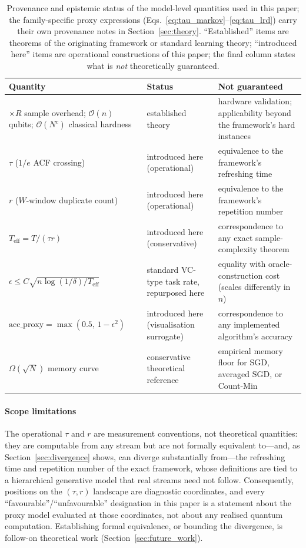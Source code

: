 \documentclass[sensors,article,submit,pdftex,moreauthors]{Definitions/mdpi}
\newcommand{\bigO}{\mathcal{O}}
\newcommand{\Teff}{T_{\mathrm{eff}}}
\begin{document}
\begin{table}[t]
\centering
\caption{Provenance and epistemic status of the model-level quantities used in this paper; the family-specific proxy expressions (Eqs.~\eqref{eq:tau_markov}--\eqref{eq:tau_lrd}) carry their own provenance notes in Section~\ref{sec:theory}. ``Established'' items are theorems of the originating framework or standard learning theory; ``introduced here'' items are operational constructions of this paper; the final column states what is \emph{not} theoretically guaranteed.}
\label{tab:provenance}
\begin{tabularx}{\textwidth}{@{}p{5.1cm}p{3.6cm}X@{}}
\toprule
Quantity & Status & Not guaranteed \\
\midrule
$\times R$ sample overhead; $\bigO(n)$ qubits; $\bigO(N^{c})$ classical hardness & established theory & hardware validation; applicability beyond the framework's hard instances \\
$\tau$ ($1/e$ ACF crossing) & introduced here (operational) & equivalence to the framework's refreshing time \\
$r$ ($W$-window duplicate count) & introduced here (operational) & equivalence to the framework's repetition number \\
$\Teff = T/(\tau r)$ & introduced here (conservative) & correspondence to any exact sample-complexity theorem \\
$\epsilon \leq C\sqrt{n \log(1/\delta)/\Teff}$ & standard VC-type task rate, repurposed here & equality with oracle-construction cost (scales differently in $n$) \\
$\mathrm{acc\_proxy} = \max(0.5,\, 1 - \epsilon^2)$ & introduced here (visualisation surrogate) & correspondence to any implemented algorithm's accuracy \\
$\Omega(\sqrt{N})$ memory curve & conservative theoretical reference & empirical memory floor for SGD, averaged SGD, or Count-Min \\
\bottomrule
\end{tabularx}
\end{table}

\paragraph{Scope limitations} The operational $\tau$ and $r$ are measurement conventions, not theoretical quantities: they are computable from any stream but are not formally equivalent to---and, as Section~\ref{sec:divergence} shows, can diverge substantially from---the refreshing time and repetition number of the exact framework, whose definitions are tied to a hierarchical generative model that real streams need not follow. Consequently, positions on the $(\tau, r)$ landscape are diagnostic coordinates, and every ``favourable''/``unfavourable'' designation in this paper is a statement about the proxy model evaluated at those coordinates, not about any realised quantum computation. Establishing formal equivalence, or bounding the divergence, is follow-on theoretical work (Section~\ref{sec:future_work}).
\end{document}
